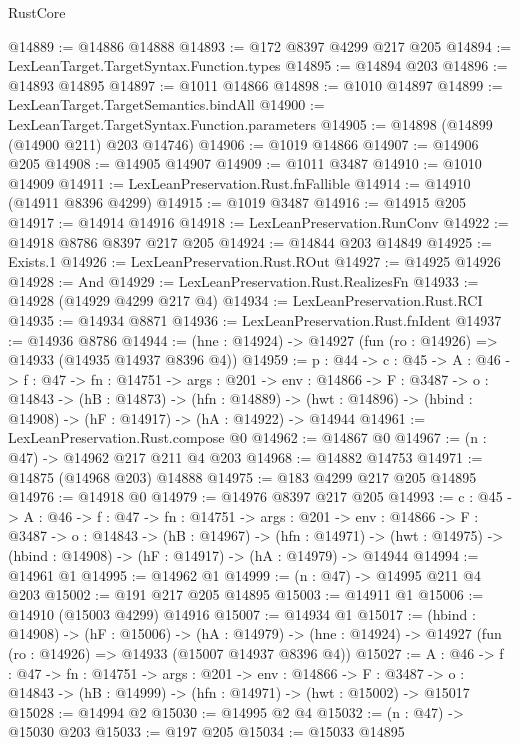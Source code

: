 \begin{lexlean}{RustCore}
\begin{coremodule}
@14889 := @14886 @14888
@14893 := @172 @8397 @4299 @217 @205
@14894 := LexLeanTarget.TargetSyntax.Function.types
@14895 := @14894 @203
@14896 := @14893 @14895
@14897 := @1011 @14866
@14898 := @1010 @14897
@14899 := LexLeanTarget.TargetSemantics.bindAll
@14900 := LexLeanTarget.TargetSyntax.Function.parameters
@14905 := @14898 (@14899 (@14900 @211) @203 @14746)
@14906 := @1019 @14866
@14907 := @14906 @205
@14908 := @14905 @14907
@14909 := @1011 @3487
@14910 := @1010 @14909
@14911 := LexLeanPreservation.Rust.fnFallible
@14914 := @14910 (@14911 @8396 @4299)
@14915 := @1019 @3487
@14916 := @14915 @205
@14917 := @14914 @14916
@14918 := LexLeanPreservation.RunConv
@14922 := @14918 @8786 @8397 @217 @205
@14924 := @14844 @203 @14849
@14925 := Exists.{1}
@14926 := LexLeanPreservation.Rust.ROut
@14927 := @14925 @14926
@14928 := And
@14929 := LexLeanPreservation.Rust.RealizesFn
@14933 := @14928 (@14929 @4299 @217 @4)
@14934 := LexLeanPreservation.Rust.RCI
@14935 := @14934 @8871
@14936 := LexLeanPreservation.Rust.fnIdent
@14937 := @14936 @8786
@14944 := (hne : @14924) -> @14927 (fun (ro : @14926) => @14933 (@14935 @14937 @8396 @4))
@14959 := {p : @44} ->
  {c : @45} ->
  {A : @46} ->
  {f : @47} ->
  {fn : @14751} ->
  {args : @201} ->
  {env : @14866} ->
  {F : @3487} ->
  {o : @14843} ->
  (hB : @14873) ->
  (hfn : @14889) -> (hwt : @14896) -> (hbind : @14908) -> (hF : @14917) -> (hA : @14922) -> @14944
@14961 := LexLeanPreservation.Rust.compose @0
@14962 := @14867 @0
@14967 := (n : @47) -> @14962 @217 @211 @4 @203
@14968 := @14882 @14753
@14971 := @14875 (@14968 @203) @14888
@14975 := @183 @4299 @217 @205 @14895
@14976 := @14918 @0
@14979 := @14976 @8397 @217 @205
@14993 := {c : @45} ->
  {A : @46} ->
  {f : @47} ->
  {fn : @14751} ->
  {args : @201} ->
  {env : @14866} ->
  {F : @3487} ->
  {o : @14843} ->
  (hB : @14967) ->
  (hfn : @14971) -> (hwt : @14975) -> (hbind : @14908) -> (hF : @14917) -> (hA : @14979) -> @14944
@14994 := @14961 @1
@14995 := @14962 @1
@14999 := (n : @47) -> @14995 @211 @4 @203
@15002 := @191 @217 @205 @14895
@15003 := @14911 @1
@15006 := @14910 (@15003 @4299) @14916
@15007 := @14934 @1
@15017 := (hbind : @14908) ->
  (hF : @15006) ->
  (hA : @14979) -> (hne : @14924) -> @14927 (fun (ro : @14926) => @14933 (@15007 @14937 @8396 @4))
@15027 := {A : @46} ->
  {f : @47} ->
  {fn : @14751} ->
  {args : @201} ->
  {env : @14866} ->
  {F : @3487} -> {o : @14843} -> (hB : @14999) -> (hfn : @14971) -> (hwt : @15002) -> @15017
@15028 := @14994 @2
@15030 := @14995 @2 @4
@15032 := (n : @47) -> @15030 @203
@15033 := @197 @205
@15034 := @15033 @14895

\end{coremodule}
\end{lexlean}
